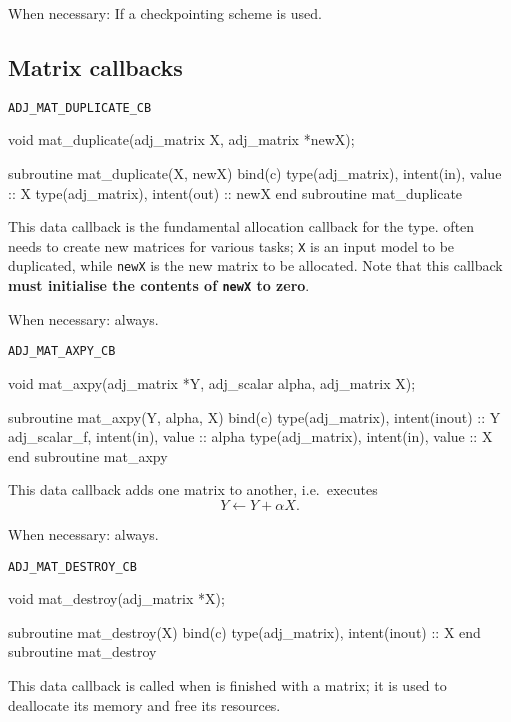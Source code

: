 When necessary: If a checkpointing scheme is used.

\subsection{Matrix callbacks} \label{sec:matrix_callbacks}
\begin{boxwithtitle}{\texttt{ADJ_MAT_DUPLICATE_CB}}
\begin{minipage}{\columnwidth}
\begin{ccode}
  void mat_duplicate(adj_matrix X, adj_matrix *newX);
\end{ccode}
\begin{fortrancode}
  subroutine mat_duplicate(X, newX) bind(c)
    type(adj_matrix), intent(in), value :: X
    type(adj_matrix), intent(out) :: newX
  end subroutine mat_duplicate
\end{fortrancode}
\end{minipage}
\end{boxwithtitle}
This data callback is the fundamental allocation callback for the  type. \libadjoint
often needs to create new matrices for various tasks; \texttt{X} is an
input model  to be duplicated, while \texttt{newX} is the new matrix
to be allocated. Note that this callback \textbf{must initialise the contents of \texttt{newX} to zero}.

When necessary: always.
\begin{boxwithtitle}{\texttt{ADJ_MAT_AXPY_CB}}
\begin{minipage}{\columnwidth}
\begin{ccode}
  void mat_axpy(adj_matrix *Y, adj_scalar alpha, adj_matrix X);
\end{ccode}
\begin{fortrancode}
  subroutine mat_axpy(Y, alpha, X) bind(c)
    type(adj_matrix), intent(inout) :: Y
    adj_scalar_f, intent(in), value :: alpha
    type(adj_matrix), intent(in), value :: X
  end subroutine mat_axpy
\end{fortrancode}
\end{minipage}
\end{boxwithtitle}
This data callback adds one matrix to another, i.e.\ executes
\begin{equation*}
Y \leftarrow Y + \alpha X.
\end{equation*}

When necessary: always.
\begin{boxwithtitle}{\texttt{ADJ_MAT_DESTROY_CB}}
\begin{minipage}{\columnwidth}
\begin{ccode}
  void mat_destroy(adj_matrix *X);
\end{ccode}
\begin{fortrancode}
  subroutine mat_destroy(X) bind(c)
    type(adj_matrix), intent(inout) :: X
  end subroutine mat_destroy
\end{fortrancode}
\end{minipage}
\end{boxwithtitle}
This data callback is called when \libadjoint is finished
with a matrix; it is used to deallocate its memory and free
its resources.

